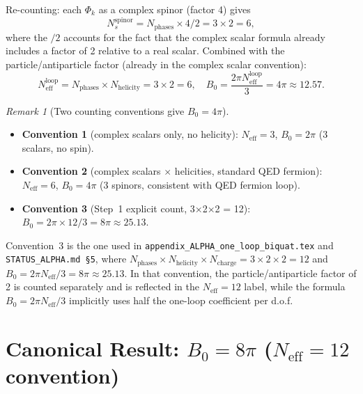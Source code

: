 \documentclass[12pt,a4paper]{article}
\theoremstyle{definition}
\theoremstyle{remark}
\newtheorem{remark}[theorem]{Remark}
\newcommand{\Neff}{N_{\mathrm{eff}}}
\begin{document}
Re-counting: each $\Phi_k$ as a complex spinor (factor 4) gives
\begin{equation}
  N_s^\mathrm{spinor} = N_\mathrm{phases} \times 4/2 = 3 \times 2 = 6,
  \label{eq:Ns_spinor}
\end{equation}
where the $/2$ accounts for the fact that the complex scalar formula already
includes a factor of 2 relative to a real scalar.  Combined with the
particle/antiparticle factor (already in the complex scalar convention):
\begin{equation}
  \Neff^{\text{loop}} = N_\mathrm{phases} \times N_\mathrm{helicity} = 3 \times 2 = 6,
  \quad
  B_0 = \frac{2\pi \Neff^{\text{loop}}}{3} = 4\pi \approx 12.57.
  \label{eq:B0_4pi}
\end{equation}

\begin{remark}[Two counting conventions give $B_0 = 4\pi$]
\label{rem:conventions}
\begin{itemize}
  \item \textbf{Convention 1} (complex scalars only, no helicity):
    $\Neff = 3$, $B_0 = 2\pi$ (3 scalars, no spin).
  \item \textbf{Convention 2} (complex scalars $\times$ helicities, standard QED fermion):
    $\Neff = 6$, $B_0 = 4\pi$ (3 spinors, consistent with QED fermion loop).
  \item \textbf{Convention 3} (Step~1 explicit count, 3×2×2 = 12):
    $B_0 = 2\pi \times 12 / 3 = 8\pi \approx 25.13$.
\end{itemize}
Convention~3 is the one used in \texttt{appendix\_ALPHA\_one\_loop\_biquat.tex}
and \texttt{STATUS\_ALPHA.md §5}, where $N_\mathrm{phases} \times N_\mathrm{helicity}
\times N_\mathrm{charge} = 3 \times 2 \times 2 = 12$ and
$B_0 = 2\pi \Neff/3 = 8\pi \approx 25.13$.  In that convention, the
particle/antiparticle factor of 2 is counted separately and is reflected
in the $\Neff = 12$ label, while the formula $B_0 = 2\pi\Neff/3$ implicitly
uses half the one-loop coefficient per d.o.f.
\end{remark}

\section{Canonical Result: $B_0 = 8\pi$ ($\Neff = 12$ convention)}
\label{sec:canonical_B0}
\end{document}
